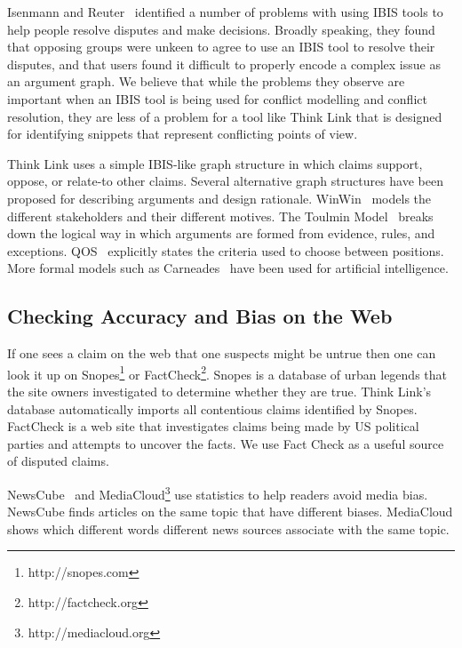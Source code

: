 \documentclass{chi2009}
\newcommand{\todo}[1]{}
\begin{document}
Isenmann and Reuter~\cite{Isenmann1997} identified a number of problems with using IBIS tools to help people resolve disputes and make decisions. Broadly speaking, they found that opposing groups were unkeen to agree to use an IBIS tool to resolve their disputes, and that users found it difficult to properly encode a complex issue as an argument graph. We believe that while the problems they observe are important when an IBIS tool is being used for conflict modelling and conflict resolution, they are less of a problem for a tool like Think Link that is designed for identifying snippets that represent conflicting points of view.

Think Link uses a simple IBIS-like graph structure in which claims support, oppose, or relate-to other claims. Several alternative graph structures have been proposed for describing arguments and design rationale. WinWin~\cite{Boehm2006} models the different stakeholders and their different motives. The Toulmin Model~\cite{toulmin1958} breaks down the logical way in which arguments are formed from evidence, rules, and exceptions. QOS~\cite{Maclean1991} explicitly states the criteria used to choose between positions. More formal models such as Carneades~\cite{Gordon2007} have been used for artificial intelligence.

\subsection{Checking Accuracy and Bias on the Web}

If one sees a claim on the web that one suspects might be untrue then one can look it up on Snopes\footnote{http://snopes.com} or FactCheck\footnote{http://factcheck.org}. Snopes is a database of urban legends that the site owners investigated to determine whether they are true. 
Think Link's database automatically imports all contentious claims identified by Snopes.
FactCheck is a web site that investigates claims being made by US political parties and attempts to uncover the facts. We use Fact Check as a useful source of disputed claims.


\todo{Make sure we stay in sync}

NewsCube~\cite{Park2009} and MediaCloud\footnote{http://mediacloud.org} use statistics to help readers avoid media bias. NewsCube finds articles on the same topic that have different biases. MediaCloud shows which different words different news sources associate with the same topic.
\end{document}
